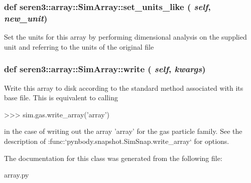  \hypertarget{classseren3_1_1array_1_1SimArray_a4ff547f1dba2c6621868071e79275494}{
\subsubsection[{set\_\-units\_\-like}]{\setlength{\rightskip}{0pt plus 5cm}def seren3::array::SimArray::set\_\-units\_\-like ( {\em self}, \/   {\em new\_\-unit})}}
\label{classseren3_1_1array_1_1SimArray_a4ff547f1dba2c6621868071e79275494}
\begin{DoxyVerb}Set the units for this array by performing dimensional analysis
on the supplied unit and referring to the units of the original
file\end{DoxyVerb}
 \hypertarget{classseren3_1_1array_1_1SimArray_a456f30350b3e494df76219b0bc305282}{
\subsubsection[{write}]{\setlength{\rightskip}{0pt plus 5cm}def seren3::array::SimArray::write ( {\em self}, \/   {\em kwargs})}}
\label{classseren3_1_1array_1_1SimArray_a456f30350b3e494df76219b0bc305282}
\begin{DoxyVerb}
Write this array to disk according to the standard method
associated with its base file. This is equivalent to calling

>>> sim.gas.write_array('array')

in the case of writing out the array 'array' for the gas
particle family.  See the description of
:func:`pynbody.snapshot.SimSnap.write_array` for options.
\end{DoxyVerb}
 

The documentation for this class was generated from the following file:\begin{DoxyCompactItemize}
\item 
array.py\end{DoxyCompactItemize}

